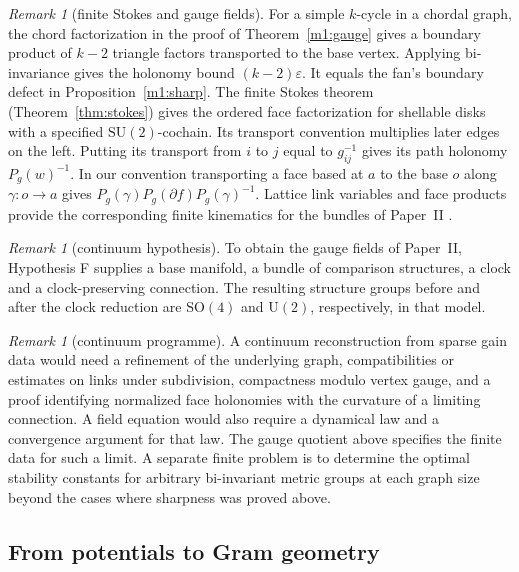 \documentclass[11pt,reqno]{amsart}
\theoremstyle{definition}
\theoremstyle{remark}
\newtheorem{remark}[theorem]{Remark}
\numberwithin{equation}{section}
\begin{document}
\begin{remark}[finite Stokes and gauge fields]\label{m1:stokes-link}
For a simple \(k\)-cycle in a chordal graph, the chord
factorization in the proof of Theorem~\ref{m1:gauge} gives a
boundary product of \(k-2\) triangle factors transported to the
base vertex. Applying bi-invariance gives the holonomy bound
\((k-2)\varepsilon\). It equals the fan's boundary defect in
Proposition~\ref{m1:sharp}. The finite Stokes theorem
(Theorem~\ref{thm:stokes}) gives the ordered face factorization
for shellable disks with a specified \(\mathrm{SU}(2)\)-cochain.
Its transport convention multiplies later edges on the left.
Putting its transport from \(i\) to \(j\) equal to \(g_{ij}^{-1}\)
gives its path holonomy \(P_g(w)^{-1}\).
In our convention transporting a face based at \(a\) to the base \(o\) along
\(\gamma:o\to a\) gives
\(P_g(\gamma)P_g(\partial f)P_g(\gamma)^{-1}\).
Lattice link variables and face products provide the
corresponding finite kinematics for the bundles of Paper~II
\cite[Sec.~\emph{Fields of comparison structures}, Theorem on Hypothesis F]{Companion}.
\end{remark}

\begin{remark}[continuum hypothesis]\label{m1:continuum-input}
To obtain the gauge fields of Paper~II, Hypothesis F supplies
a base manifold, a bundle of comparison structures, a clock
and a clock-preserving connection. The resulting structure groups
before and after the clock reduction are \(\mathrm{SO}(4)\)
and \(\mathrm U(2)\), respectively, in that model.
\end{remark}

\begin{remark}[continuum programme]\label{m1:continuum-programme}
A continuum reconstruction from sparse gain data would need a
refinement of the underlying graph, compatibilities or estimates
on links under subdivision, compactness modulo vertex gauge,
and a proof identifying normalized face holonomies with the
curvature of a limiting connection. A field equation would also
require a dynamical law and a convergence argument for that law.
The gauge quotient above specifies the finite data for such a
limit. A separate finite problem is to determine the optimal
stability constants for arbitrary bi-invariant metric groups at
each graph size beyond the cases where sharpness was proved above.
\end{remark}

\subsection{From potentials to Gram geometry}
\end{document}

